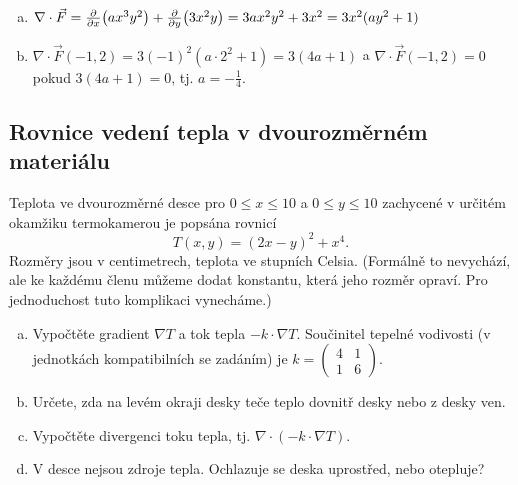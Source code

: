 \begin{enumerate}[a)]
\item $\nabla \cdot \vec F=\pdv{x}(ax^3y^2)+\pdv{y}(3x^2y)
=3ax^2y^2+3x^2=3x^2(ay^2+1)$
\item $\nabla \cdot \vec F (-1,2)=3(-1)^2(a\cdot 2^2+1)=3(4a+1) $ a $\nabla \cdot \vec F (-1,2)=0$ pokud $3(4a+1)=0$, tj. $a=-\frac 14$.
\end{enumerate}
\konec


\subsection{Rovnice vedení tepla v dvourozměrném materiálu}

Teplota ve dvourozměrné desce pro $0\leq x\leq 10$ a $0\leq y\leq 10$ zachycené v určitém okamžiku termokamerou je popsána rovnicí
  $$T(x,y)=(2x-y)^2+x^4.$$
  Rozměry jsou v centimetrech, teplota ve stupních Celsia. (Formálně to nevychází, ale ke každému členu můžeme dodat konstantu, která jeho rozměr opraví. Pro jednoduchost tuto komplikaci vynecháme.)

\begin{enumerate}[a)]
\item Vypočtěte gradient $\nabla T$  a tok tepla $-k \cdot \nabla T.$
Součinitel tepelné vodivosti (v jednotkách kompatibilních se zadáním) je $k=
  \begin{pmatrix}
    4 & 1\\1&6
  \end{pmatrix}.
$ 
\item Určete, zda na levém okraji desky teče teplo dovnitř desky nebo z desky ven.
\item Vypočtěte divergenci toku tepla, tj. $\nabla\cdot(-k \cdot \nabla T).$
\item V desce nejsou zdroje tepla. Ochlazuje se deska uprostřed, nebo otepluje?
\end{enumerate}

